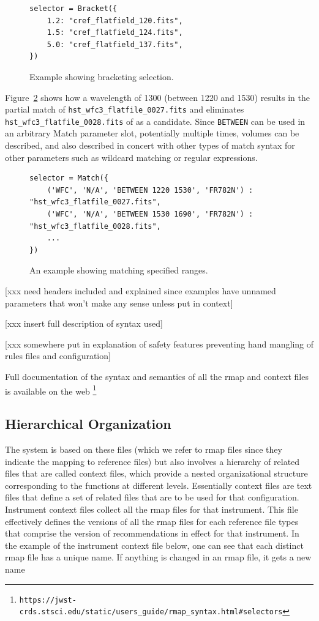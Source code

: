 \documentclass[final,authoryear,5p,times,twocolumn]{elsarticle}
\begin{document}
\begin{figure}
\begin{verbatim}
selector = Bracket({
    1.2: "cref_flatfield_120.fits",
    1.5: "cref_flatfield_124.fits",
    5.0: "cref_flatfield_137.fits",
})
\end{verbatim}
\caption{Example showing bracketing selection.}
\label{fig:example3}
\end{figure}

Figure~\ref{fig:example4} shows how a
wavelength of 1300 (between 1220 and 1530) results in the partial match 
of \texttt{hst\_wfc3\_flatfile\_0027.fits} and eliminates 
\texttt{hst\_wfc3\_flatfile\_0028.fits}
of as a candidate.   Since \texttt{BETWEEN}
can be used in an arbitrary Match parameter
slot,  potentially multiple times,  volumes can be described, and also
described in concert with other types of match syntax for other parameters
such as wildcard matching or regular expressions.

\begin{figure}
\begin{verbatim}
selector = Match({
    ('WFC', 'N/A', 'BETWEEN 1220 1530', 'FR782N') :  "hst_wfc3_flatfile_0027.fits",
    ('WFC', 'N/A', 'BETWEEN 1530 1690', 'FR782N') :  "hst_wfc3_flatfile_0028.fits",
    ...
})
\end{verbatim}
\caption{An example showing matching specified ranges.}
\label{fig:example4}
\end{figure}

[xxx need headers included and explained since examples have unnamed
parameters that won't make any sense unless put in context]

[xxx insert full description of syntax used]

[xxx somewhere put in explanation of safety features preventing hand
mangling of rules files and configuration]

Full documentation of the syntax and semantics of all the rmap and
context files is available on the web 
\footnote{\texttt{https://jwst-crds.stsci.edu/static/users\_guide/rmap\_syntax.html\#selectors}}

\subsection{Hierarchical Organization}

The system is based on these files (which we refer to rmap files since they
indicate the mapping to reference files) but also involves a hierarchy of
related files that are called context files, which provide a nested 
organizational structure corresponding to the functions at different levels. Essentially context files are
text files that define a set of related files that are to be used for
that configuration.
Instrument context files collect all the rmap files for that
instrument. This file effectively defines the versions of all the rmap files
for each reference file types that comprise the version of recommendations in
effect for that instrument. In the example of the instrument context file
below, one can see that each distinct rmap file has a unique name. If anything
is changed in an rmap file, it gets a new name
\end{document}

